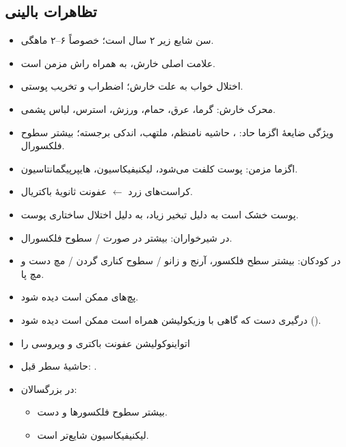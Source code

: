 \documentclass[12pt,a4paper]{article}
\begin{document}
\subsection*{تظاهرات بالینی }
\begin{itemize}
  \item سن شایع زیر ۲ سال است؛ خصوصاً ۶–۲ ماهگی.
  \item علامت اصلی خارش، به همراه راش مزمن  است.
  \item اختلال خواب به علت خارش؛ اضطراب و تخریب پوستی.
  \item محرک خارش: گرما، عرق، حمام، ورزش، استرس، لباس پشمی.
  \item ویژگی ضایعهٔ اگزما حاد: ، حاشیه نامنظم، ملتهب، اندکی برجسته؛ بیشتر سطوح فلکسورال.
  \item اگزما مزمن: پوست کلفت می‌شود، لیکنیفیکاسیون، هایپرپیگمانتاسیون.
  \item کراست‌های زرد $\leftarrow$ عفونت ثانویهٔ باکتریال.
  \item پوست خشک است به دلیل تبخیر زیاد، به دلیل اختلال ساختاری پوست.
  \item در شیرخواران: بیشتر در صورت / سطوح فلکسورال.
\end{itemize}

\begin{itemize}
  \item در کودکان: بیشتر سطح فلکسور، آرنج و زانو / سطوح کناری گردن / مچ دست و مچ پا.
  \item پچ‌های  ممکن است دیده شود.
  \item درگیری دست که گاهی با وزیکولیشن همراه است ممکن است دیده شود ().
  \item اتواینوکولیشن  عفونت باکتری و ویروسی را \Atopiccut
  \item حاشیهٔ سطر قبل: .
  \item در بزرگسالان:
  \begin{itemize}
    \item بیشتر سطوح فلکسورها و دست.
    \item لیکنیفیکاسیون شایع‌تر است.
  \end{itemize}
\end{itemize}
\end{document}
